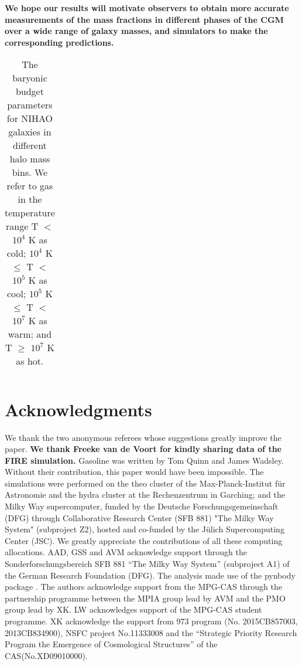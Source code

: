 \documentclass[useAMS,usenatbib]{mn2e}
\begin{document}
{\bf We hope our results will motivate observers to obtain more
  accurate measurements of the mass fractions in different phases of
  the CGM over a wide range of galaxy masses, and simulators to make
  the corresponding predictions.}

\begin{table*}
  \caption{The baryonic budget parameters for NIHAO galaxies
    in different halo  mass bins. We refer to gas in the temperature range  T
  $<$ $10^4$ K as cold; $10^4$ K $\leqslant$ T $<$ $10^5$ K as cool;
  $10^5$ K $\leqslant$ T $<$ $10^7$ K as warm;  and T $\geqslant$
  $10^7$ K as hot.}
\begin{center}
\begin{tabular}{ccccc}
\hline

\hline
\end{tabular}
\label{tab:comparison}
\end{center}
\end{table*}





\section*{Acknowledgments} 

We thank the two anonymous referees whose suggestions greatly  improve
the paper.  {\bf We thank Freeke van de Voort for kindly sharing data
  of the FIRE simulation.}  {\sc Gasoline} was written by Tom Quinn
and James Wadsley. Without their contribution, this paper would have
been impossible.
%
The simulations were performed on the {\sc theo} cluster of the
Max-Planck-Institut f\"ur Astronomie and the {\sc hydra} cluster at
the Rechenzentrum in Garching; and the Milky Way supercomputer, funded
by the Deutsche Forschungsgemeinschaft (DFG) through Collaborative
Research Center (SFB 881) "The Milky Way System" (subproject Z2),
hosted and co-funded by the J\"ulich Supercomputing Center (JSC). We
greatly appreciate the contributions of all these computing
allocations.
%
AAD, GSS and AVM acknowledge support through the
Sonderforschungsbereich SFB 881 “The Milky Way System” (subproject A1)
of the German Research Foundation (DFG).  The analysis made use of the
pynbody package \citep{Pontzen13}.
%
The authors acknowledge support from the MPG-CAS through the
partnership programme between the MPIA group lead by AVM and the PMO
group lead by XK.
%
LW acknowledges support of the MPG-CAS student programme.
%
XK acknowledge the support from 973 program (No. 2015CB857003,
2013CB834900), NSFC project No.11333008 and the ``Strategic Priority
Research Program the Emergence of Cosmological Structures'' of the
CAS(No.XD09010000).
\end{document}
